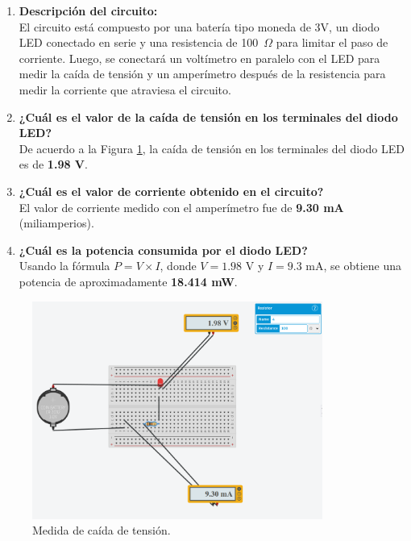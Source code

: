 \documentclass{article}
\begin{document}
\begin{enumerate}
    \item \textbf{Descripción del circuito:} \\
    El circuito está compuesto por una batería tipo moneda de 3V, un diodo LED conectado en serie y una resistencia de 100~$\Omega$ para limitar el paso de corriente. Luego, se conectará un voltímetro en paralelo con el LED para medir la caída de tensión y un amperímetro después de la resistencia para medir la corriente que atraviesa el circuito.

    \item \textbf{¿Cuál es el valor de la caída de tensión en los terminales del diodo LED?} \\
    De acuerdo a la Figura \ref{fig:caida_tension}, la caída de tensión en los terminales del diodo LED es de \textbf{1.98 V}.

    \item \textbf{¿Cuál es el valor de corriente obtenido en el circuito?} \\
    El valor de corriente medido con el amperímetro fue de \textbf{9.30 mA} (miliamperios).

    \item \textbf{¿Cuál es la potencia consumida por el diodo LED?} \\
    Usando la fórmula $P = V \times I$, donde $V = 1.98$ V y $I = 9.3$ mA, se obtiene una potencia de aproximadamente \textbf{18.414 mW}.
\end{enumerate}

\begin{figure}[H]
    \centering
    \includegraphics[width=0.85\textwidth]{./img/ckpt_1_1.png}
    \caption{Medida de caída de tensión.}
    \label{fig:caida_tension}
\end{figure}
\end{document}
